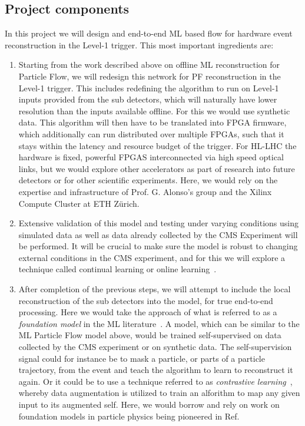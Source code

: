 \documentclass[12pt]{iopart}
\begin{document}
\subsection{Project components}
In this project we will design and end-to-end ML based flow for hardware event reconstruction in the Level-1 trigger. This most important ingredients are:
\begin{enumerate}
    \item Starting from the work described above on offline ML reconstruction for Particle Flow, we will redesign this network for PF reconstruction in the Level-1 trigger. This includes redefining the algorithm to run on Level-1 inputs provided from the sub detectors, which will naturally have lower resolution than the inputs available offline. For this we would use synthetic data. This algorithm will then have to be translated into FPGA firmware, which additionally can run distributed over multiple FPGAs, such that it stays within the latency and resource budget of the trigger. For HL-LHC the hardware is fixed, powerful FPGAS interconnected via high speed optical links, but we would explore other accelerators as part of research into future detectors or for other scientific experiments. Here, we would rely on the expertise and infrastructure of Prof. G. Alonso's group and the Xilinx Compute Cluster at ETH Zürich.
    \item Extensive validation of this model and testing under varying conditions using simulated data as well as data already collected by the CMS Experiment will be performed. It will be crucial to make sure the model is robust to changing external conditions in the CMS experiment, and for this we will explore a technique called continual learning or online learning~\cite{soutifcormerais2023comprehensive}. 
    \item After completion of the previous steps, we will attempt to include the local reconstruction of the sub detectors into the model, for true end-to-end processing. Here we would take the approach of what is referred to as a \textit{foundation model} in the ML literature~\cite{Bommasani2021FoundationModels}. A model, which can be similar to the ML Particle Flow model above, would be trained self-supervised on data collected by the CMS experiment or on synthetic data. The self-supervision signal could for instance be to mask a particle, or parts of a particle trajectory, from the event and teach the algorithm to learn to reconstruct it again. Or it could be to use a technique referred to as \textit{contrastive learning}~\cite{chen2020simple}, whereby data augmentation is utilized to train an alforithm to map any given input to its augmented self. Here, we would borrow and rely on work on foundation models in particle physics being pioneered in Ref.~\cite{foundation}
\end{enumerate}
\end{document}
